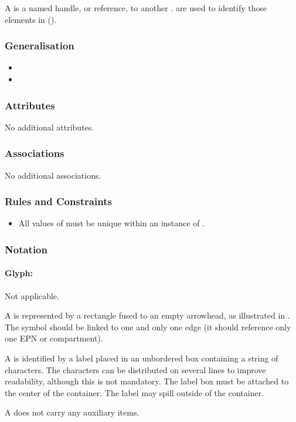 A  is a named handle, or reference, to another .   are used to identify those elements in  ().

\subsubsection{Generalisation}

\begin{itemize}
\item {}
\item {}
\end{itemize}

\subsubsection{Attributes}

No additional attributes.

\subsubsection{Associations}

No additional associations.

\subsubsection{Rules and Constraints}

\begin{itemize}
\item All values of  must be unique within an
  instance of .
\end{itemize}

\subsubsection{Notation}

\paragraph{Glyph: }
\label{sec:tag}

\begin{glyphDescription}

\glyphSboTerm Not applicable.

\glyphContainer A  is represented by a rectangle fused to an empty arrowhead, as illustrated in .  The symbol should be linked to one and only one edge (\ie it should reference only one EPN or compartment).

\glyphLabel A  is identified by a label placed in an unbordered box containing a string of characters.  The characters can be distributed on several lines to improve readability, although this is not mandatory.  The label box must be attached to the center of the container. The label may spill outside of the container.

\glyphAux A  does not carry any auxiliary items. 

\end{glyphDescription}

